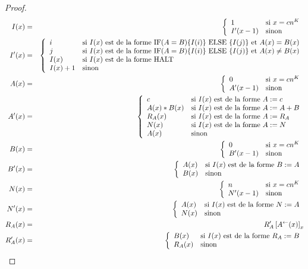 \documentclass{report}
\newcommand{\sRAMif}[2]{\text{IF} (A=B) \{I( #1 )\} \text{ ELSE } \{I( #2 )\}}
\newcommand{\eqpred}[3]{#1\left[ #2^{\leftarrow}(#3) \right]_{#3}}
\begin{document}
\begin{proof}
{\begin{minipage}{0.9\textwidth}
				\setcounter{equation}{0}
				\begin{eqnarray}
					I(x) & = & \casedist{
							1			& 	\text{si $x = c n^K$} \\
							I'(x-1)		& 	\text{sinon}
							} \\
					I'(x) & = & \casedist{
							i			& 	\text{si $I(x)$ est de la forme $\sRAMif{i}{j}$ et $A(x) = B(x)$} \\
							j			& 	\text{si $I(x)$ est de la forme $\sRAMif{i}{j}$ et $A(x) \neq B(x)$} \\
							I(x)		&  	\text{si $I(x)$ est de la forme $\text{HALT}$} \\
							I(x) + 1 	& 	\text{sinon} 
							} \\
					A(x) & = & \casedist{
							0			& 	\text{si $x = cn^K$} \\
							A'(x-1)		& 	\text{sinon}
							} \\
					A'(x) & = & \casedist{
							c			& 	\text{si $I(x)$ est de la forme $A := c$} \\
							A(x) * B(x)	& 	\text{si $I(x)$ est de la forme $A := A + B$} \\
							R_A(x) 		& 	\text{si $I(x)$ est de la forme $A := R_A$} \\
							N(x)		& 	\text{si $I(x)$ est de la forme $A := N$} \\
							A(x)		& 	\text{sinon}
							} \\
					B(x) & = & \casedist{
							0			& 	\text{si $x = cn^K$} \\
							B'(x-1)		& 	\text{sinon}
							} \\
					B'(x) & = & \casedist{
							A(x)		& 	\text{si $I(x)$ est de la forme $B := A$} \\
							B(x)		& 	\text{sinon}
							} \\
					N(x) & = & \casedist{
							n			& 	\text{si $x = cn^K$} \\
							N'(x-1)		& 	\text{sinon}
							} \\
					N'(x) & = & \casedist{
							A(x)		& 	\text{si $I(x)$ est de la forme $N := A$} \\
							N(x)		& 	\text{sinon}
							} \\
					R_A(x) & = & \eqpred{R_A'}{A}{x} \\
					R_A'(x) & = & \casedist{
							B(x)		& 	\text{si $I(x)$ est de la forme $R_A := B$} \\
							R_A(x)		& 	\text{sinon}
							}
				\end{eqnarray}
			

\end{minipage}}
\end{proof}
\end{document}
